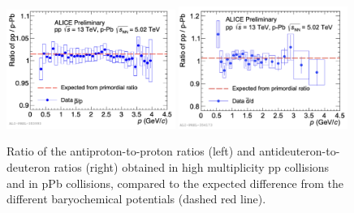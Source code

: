 \begin{figure}[h]
    \centering
    \includegraphics[width=0.49\textwidth]{figures/antiproton-to-proton-ratio-pp-pPb-comparison.png}
    \includegraphics[width=0.49\textwidth]{figures/antideuteron-to-deuteron-ratio-comparison-pp-pPb.png}
    \caption{Ratio of the antiproton-to-proton ratios (left) and antideuteron-to-deuteron ratios (right) obtained in high multiplicity pp collisions and in pPb collisions, compared to the expected difference from the different baryochemical potentials (dashed red line).}
    \label{fig:pp_pPb_dbardRatio}
\end{figure}

